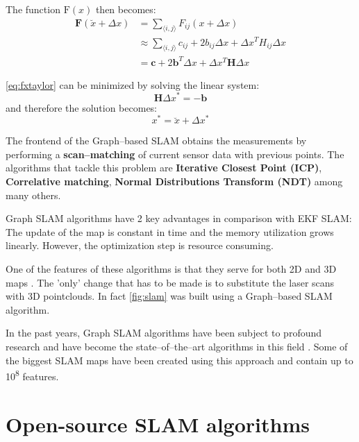 The function $\mathrm{F}(x)$ then becomes:
\begin{equation}
  \begin{split}
    \mathbf{F}(\breve{x}+\Delta x) & = \sum\limits_{\langle i, j \rangle} F_{ij}(x + \Delta x)\\
                                   & \approx \sum\limits_{\langle i, j \rangle} c_{ij} + 2b_{ij}\Delta x + \Delta x^T H_{ij} \Delta x\\
                                   & = \mathbf{c} + 2\mathbf{b}^T\Delta x + \Delta x^T \mathbf{H} \Delta x
  \end{split}  
  \label{eq:fxtaylor}
\end{equation}

\autoref{eq:fxtaylor} can be minimized by solving the linear system:
\begin{equation}
  \mathbf{H}\Delta x^* = -\mathbf{b}
  \label{eq:linearsolve}
\end{equation} 
and therefore the solution becomes:
\begin{equation}
  x^* = \breve{x} + \Delta x^*
  \label{eq:solution}
\end{equation} 

 The frontend of the Graph--based SLAM obtains the measurements by performing a \textbf{scan--matching} of current sensor data with previous points. The algorithms that tackle this problem are \textbf{Iterative Closest Point (ICP)}, \textbf{Correlative matching}, \textbf{Normal Distributions Transform (NDT)} among many others.

Graph SLAM algorithms have 2 key advantages  in comparison with EKF SLAM: The update of the map is constant in time and the memory utilization grows linearly. However, the optimization step is resource consuming.

One of the features of these algorithms is that they serve for both 2D and 3D maps . The 'only' change that has to be made is to substitute the laser scans with 3D pointclouds. In fact \autoref{fig:slam} was built using a Graph--based SLAM algorithm.

In the past years, Graph SLAM algorithms have been subject to profound research and have become the state--of--the--art algorithms in this field . Some of the biggest SLAM maps have been created using this approach and contain up to 10\textsuperscript{8} features.

\section{Open-source SLAM algorithms}

